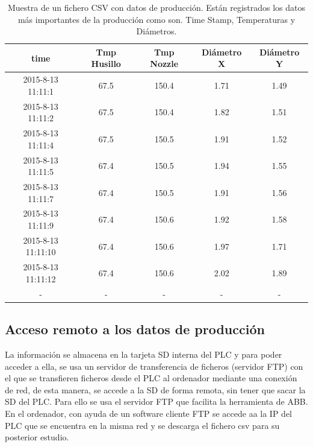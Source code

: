\begin{table}[H]
    \centering
    \begin{tabular}{ccccc}
        {\bf time}         & {\bf Tmp Husillo} & {\bf Tmp Nozzle} & {\bf Diámetro X} & {\bf Diámetro Y} \\ \hline
        2015-8-13 11:11:1  & 67.5              & 150.4            & 1.71         & 1.49         \\
        2015-8-13 11:11:2  & 67.5              & 150.4            & 1.82         & 1.51         \\
        2015-8-13 11:11:4  & 67.5              & 150.5            & 1.91         & 1.52         \\
        2015-8-13 11:11:5  & 67.4              & 150.5            & 1.94         & 1.55         \\
        2015-8-13 11:11:7  & 67.4              & 150.5            & 1.91         & 1.56         \\
        2015-8-13 11:11:9  & 67.4              & 150.6            & 1.92         & 1.58         \\
        2015-8-13 11:11:10 & 67.4              & 150.6            & 1.97         & 1.71         \\
        2015-8-13 11:11:12 & 67.4              & 150.6            & 2.02         & 1.89        \\
                -          &    -              & -                & -                & -
    \end{tabular}
    \caption[Muestra de un fichero CSV con datos de producción.]{Muestra de un fichero CSV con datos de producción. Están registrados los datos más importantes de la producción como son. Time Stamp, Temperaturas y Diámetros.}
    \label{tab:plc_csv}
\end{table}

\subsection{Acceso remoto a los datos de producción}
\label{sec:plc_scada}

La información se almacena en la tarjeta SD interna del PLC y para poder acceder a ella, se usa un servidor de transferencia de ficheros (servidor FTP) con el que se transfieren ficheros desde el PLC al ordenador mediante una conexión de red, de esta manera, se accede a la SD de forma remota, sin tener que sacar la SD del PLC. Para ello se usa el servidor FTP que facilita la herramienta de ABB. En el ordenador, con ayuda de un software cliente FTP se accede aa la IP del PLC que se encuentra en la misma red y se descarga el fichero csv para su posterior estudio.\\


